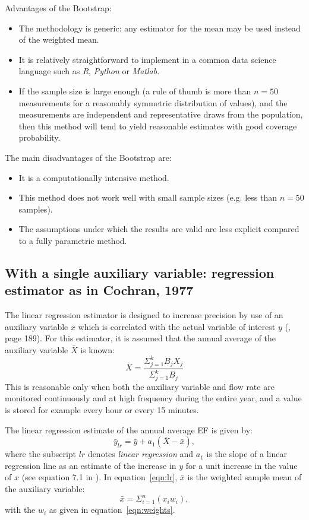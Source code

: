 Advantages of the Bootstrap:
\begin{itemize}
	\item The methodology is generic: any estimator for the mean may be used instead of the weighted mean.
	\item It is relatively straightforward to implement in a common data science language such as \textit{R}, \textit{Python} or \textit{Matlab}.
	\item If the sample size is large enough (a rule of thumb is more than $n=50$ measurements for a reasonably symmetric distribution of values), and the measurements are independent and representative draws from the population, then this method will tend to yield reasonable estimates with good coverage probability.
\end{itemize}

The main disadvantages of the Bootstrap are:
\begin{itemize}
	\item It is a computationally intensive method.
	\item This method does not work well with small sample sizes (e.g. less than $n=50$ samples).
	\item The assumptions under which the results are valid are less explicit compared to a fully parametric method.
\end{itemize}

\subsection{With a single auxiliary variable: regression estimator as in Cochran, 1977}\label{AuxCochran}

The linear regression estimator is designed to increase precision by use of an auxiliary variable $x$ which is correlated with the actual variable of interest $y$ (\cite{Cochran77}, page 189). For this estimator, it is assumed that the annual average of the auxiliary variable $\bar{X}$ is known:
\begin{equation}\label{eqn:barbigX}
\bar{X}=\frac{\Sigma_{j=1}^k B_j X_j}{\Sigma_{j=1}^k B_j} 
\end{equation}
This is reasonable only when both the auxiliary variable and flow rate are monitored continuously and at high frequency during the entire year, and a value is stored for example every hour or every 15 minutes.

The linear regression estimate of the annual average EF is given by:
\begin{equation}\label{eqn:lr}
\bar{y}_{lr}=\bar{y}+a_1(\bar{X}-\bar{x}),
\end{equation}
where the subscript $lr$ denotes \textit{linear regression} and $a_1$ is the slope of a linear regression line as an estimate of the increase in $y$ for a unit increase in the value of $x$ (see equation 7.1 in \cite{Cochran77}). In equation~\ref{eqn:lr}, $\bar{x}$ is the weighted sample mean of the auxiliary variable:
\begin{equation}\label{eqn:barx}
\bar{x}=\Sigma_{i=1}^{n}(x_i w_i),
\end{equation}
with the $w_i$ as given in equation~\ref{eqn:weights}.

